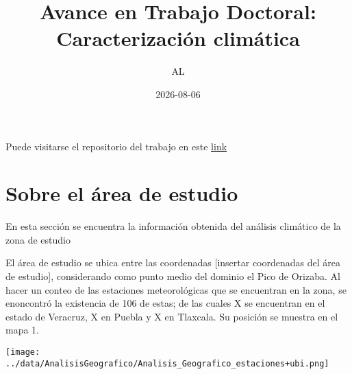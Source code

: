 \documentclass[
  11pt,
  letterpaper,
  DIV=11,
  numbers=noendperiod]{scrartcl}
\title{Avance en Trabajo Doctoral: Caracterización climática}
\author{AL}
\date{2026-08-06}
\begin{document}
\maketitle


\begin{tcolorbox}[enhanced jigsaw, colback=white, coltitle=black, leftrule=.75mm, rightrule=.15mm, breakable, left=2mm, toptitle=1mm, opacityback=0, colframe=quarto-callout-tip-color-frame, colbacktitle=quarto-callout-tip-color!10!white, bottomtitle=1mm, title=\textcolor{quarto-callout-tip-color}{\faLightbulb}\hspace{0.5em}{repositorio del trabajo}, toprule=.15mm, arc=.35mm, bottomrule=.15mm, titlerule=0mm, opacitybacktitle=0.6]

Puede visitarse el repositorio del trabajo en este
\href{https://github.com/abigaillopezm/DhP_Gaby.git}{link}

\end{tcolorbox}

\section{Sobre el área de estudio}\label{sobre-el-uxe1rea-de-estudio}

\begin{tcolorbox}[enhanced jigsaw, colback=white, coltitle=black, leftrule=.75mm, rightrule=.15mm, breakable, left=2mm, toptitle=1mm, opacityback=0, colframe=quarto-callout-important-color-frame, colbacktitle=quarto-callout-important-color!10!white, bottomtitle=1mm, title=\textcolor{quarto-callout-important-color}{\faExclamation}\hspace{0.5em}{Descripción de la sección}, toprule=.15mm, arc=.35mm, bottomrule=.15mm, titlerule=0mm, opacitybacktitle=0.6]

En esta sección se encuentra la información obtenida del análisis
climático de la zona de estudio

\end{tcolorbox}

El área de estudio se ubica entre las coordenadas {[}insertar
coordenadas del área de estudio{]}, considerando como punto medio del
dominio el Pico de Orizaba. Al hacer un conteo de las estaciones
meteorológicas que se encuentran en la zona, se enoncontró la existencia
de 106 de estas; de las cuales X se encuentran en el estado de Veracruz,
X en Puebla y X en Tlaxcala. Su posición se muestra en el mapa 1.
\begin{center}
\texttt{[image: ../data/AnalisisGeografico/Analisis\_Geografico\_estaciones+ubi.png]}
\end{center}
\end{document}

